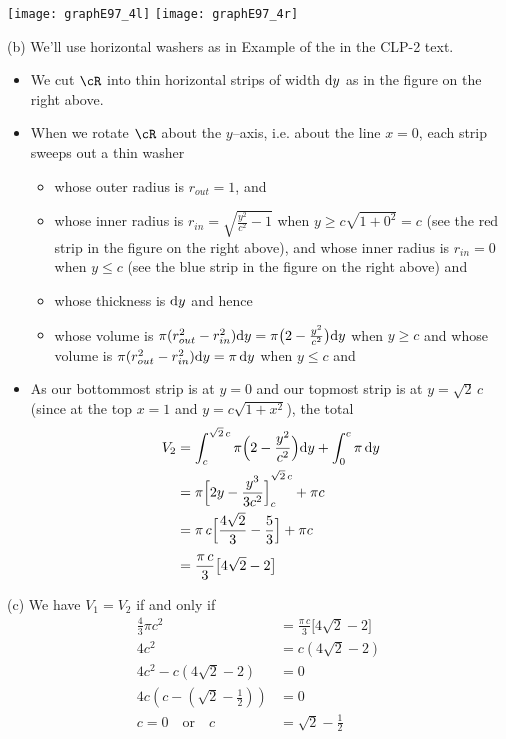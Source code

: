 \begin{solution}
\begin{center}
       \texttt{[image: graphE97\_4l]}\qquad\qquad
       \texttt{[image: graphE97\_4r]}
\end{center}


\noindent (b)
We'll use horizontal washers as in Example  
of the %
 in the CLP-2 text.
 \begin{itemize}
\item We cut $\cR$ into thin horizontal  strips of width $\mathrm{d}y$ as in
the figure on the right above.

\item When we rotate $\cR$ about the $y$--axis, i.e. about the line $x=0$, each strip
sweeps out a thin washer
\begin{itemize}
\item
whose outer radius is $r_{out}=1$, and
\item
whose inner radius is $r_{in}= \sqrt{\frac{y^2}{c^2}-1}$ when $y\ge c\sqrt{1+0^2}=c$
(see the red strip in the figure on the right above),  and
whose inner radius is $r_{in}= 0$ when $y\le c$
(see the blue strip in the figure on the right above) and
\item
whose thickness is $\mathrm{d}y$ and hence
\item
whose volume is
$\pi(r_{out}^2 - r_{in}^2)\mathrm{d}y = \pi\big(2-\frac{y^2}{c^2}\big)\mathrm{d}y$
when $y\ge c$ and  whose volume is
$\pi(r_{out}^2 - r_{in}^2)\mathrm{d}y = \pi\,\mathrm{d}y$
when $y\le c$ and

\end{itemize}
\item As our bottommost strip is at $y=0$ and our topmost
strip is at $y=\sqrt{2}\,c$ (since at the top $x=1$ and $y= c\sqrt{1+x^2}$), the total
\begin{align*}
V_2
&= \int _c^{\sqrt{2}\,c}  \pi\Big(2-\frac{y^2}{c^2}\Big)\mathrm{d}y
+\int _ 0^c \pi\,\mathrm{d}y \\
&=\pi{\Big[2y -\frac{y^3}{3c^2}\Big]}_c^{\sqrt{2}\,c} +\pi c\\
&=\pi\,c\Big[\frac{4\sqrt{2}}{3}-\frac{5}{3} \Big]+\pi c \\[0.05in]
&=\frac{\pi\,c}{3}\big[4\sqrt{2}-2 \big]
\end{align*}
\end{itemize}

\noindent (c)
We have $V_1=V_2$ if and only if
\begin{align*}
\frac{4}{3}\pi c^2&=\frac{\pi\,c}{3}\big[4\sqrt{2}-2 \big]  \\
4c^2&=c\left(4\sqrt{2}-2\right)\\
4c^2-c\left(4\sqrt{2}-2\right)&=0\\
4c\left(c - \left(\sqrt{2}-\frac{1}{2}\right)\right)&=0\\
c=0 \quad\mbox{or}\quad c&=\sqrt{2}-\frac{1}{2}
\end{align*}


\end{solution}


